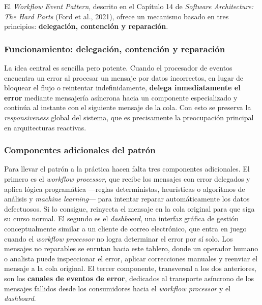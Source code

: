 
El \emph{Workflow Event Pattern}, descrito en el Capítulo 14 de \emph{Software
Architecture: The Hard Parts} (Ford et al., 2021), ofrece un mecanismo basado en tres principios: \textbf{delegación, contención y
reparación}.

\subsubsection{Funcionamiento: delegación, contención y reparación}

La idea central es sencilla pero potente. Cuando el procesador de eventos encuentra
un error al procesar un mensaje por datos incorrectos, en lugar de bloquear el flujo
o reintentar indefinidamente, \textbf{delega inmediatamente el error} mediante
mensajería asíncrona hacia un componente especializado y continúa al instante con el
siguiente mensaje de la cola. Con esto se preserva la \emph{responsiveness} global
del sistema, que es precisamente la preocupación principal en arquitecturas
reactivas.

\subsubsection{Componentes adicionales del patrón}

Para llevar el patrón a la práctica hacen falta tres componentes adicionales. El
primero es el \emph{workflow processor}, que recibe los mensajes con error delegados
y aplica lógica programática ---reglas deterministas, heurísticas o algoritmos de
análisis y \emph{machine learning}--- para intentar reparar automáticamente los
datos defectuosos. Si lo consigue, reinyecta el mensaje en la cola original para que
siga su curso normal. El segundo es el \emph{dashboard}, una interfaz gráfica de
gestión conceptualmente similar a un cliente de correo electrónico, que entra en
juego cuando el \emph{workflow processor} no logra determinar el error por sí solo.
Los mensajes no reparables se enrutan hacia este tablero, donde un operador humano o
analista puede inspeccionar el error, aplicar correcciones manuales y reenviar el
mensaje a la cola original. El tercer componente, transversal a los dos anteriores,
son los \textbf{canales de eventos de error}, dedicados al transporte asíncrono de
los mensajes fallidos desde los consumidores hacia el \emph{workflow processor} y el
\emph{dashboard}.


